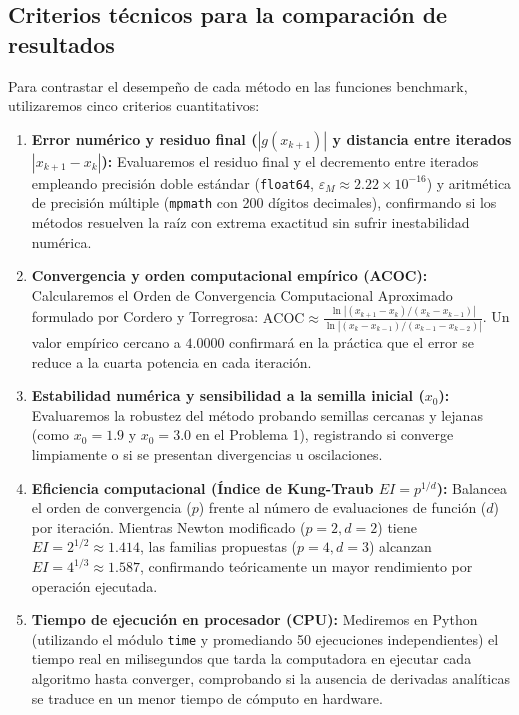 ﻿\documentclass[10pt, a4paper]{article}
\begin{document}
\subsection{Criterios técnicos para la comparación de resultados}
Para contrastar el desempeño de cada método en las funciones benchmark, utilizaremos cinco criterios cuantitativos:
\begin{enumerate}
    \item \textbf{Error numérico y residuo final ($|g(x_{k+1})|$ y distancia entre iterados $|x_{k+1} - x_k|$):}
    Evaluaremos el residuo final y el decremento entre iterados empleando precisión doble estándar (\texttt{float64}, $\varepsilon_M \approx 2.22 \times 10^{-16}$) y aritmética de precisión múltiple (\texttt{mpmath} con 200 dígitos decimales), confirmando si los métodos resuelven la raíz con extrema exactitud sin sufrir inestabilidad numérica.
    \item \textbf{Convergencia y orden computacional empírico (ACOC):}
    Calcularemos el Orden de Convergencia Computacional Aproximado formulado por Cordero y Torregrosa:
    $\text{ACOC} \approx \frac{\ln |(x_{k+1} - x_k) / (x_k - x_{k-1})|}{\ln |(x_k - x_{k-1}) / (x_{k-1} - x_{k-2})|}$. Un valor empírico cercano a $4.0000$ confirmará en la práctica que el error se reduce a la cuarta potencia en cada iteración.
    \item \textbf{Estabilidad numérica y sensibilidad a la semilla inicial ($x_0$):}
    Evaluaremos la robustez del método probando semillas cercanas y lejanas (como $x_0 = 1.9$ y $x_0 = 3.0$ en el Problema 1), registrando si converge limpiamente o si se presentan divergencias u oscilaciones.
    \item \textbf{Eficiencia computacional (Índice de Kung-Traub $EI = p^{1/d}$):}
    Balancea el orden de convergencia ($p$) frente al número de evaluaciones de función ($d$) por iteración. Mientras Newton modificado ($p=2, d=2$) tiene $EI = 2^{1/2} \approx 1.414$, las familias propuestas ($p=4, d=3$) alcanzan $EI = 4^{1/3} \approx 1.587$, confirmando teóricamente un mayor rendimiento por operación ejecutada.
    \item \textbf{Tiempo de ejecución en procesador (CPU):}
    Mediremos en Python (utilizando el módulo \texttt{time} y promediando 50 ejecuciones independientes) el tiempo real en milisegundos que tarda la computadora en ejecutar cada algoritmo hasta converger, comprobando si la ausencia de derivadas analíticas se traduce en un menor tiempo de cómputo en hardware.
\end{enumerate}
\end{document}
